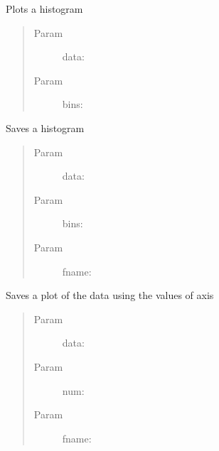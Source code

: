 \documentclass[letterpaper,10pt,english]{sphinxmanual}
\begin{document}

\begin{fulllineitems}
\label{index:SuperHub.Plots.plotHisto}
Plots a histogram
\begin{quote}\begin{description}
\item[{Param }] \leavevmode
data:

\item[{Param }] \leavevmode
bins:

\end{description}\end{quote}

\end{fulllineitems}


\begin{fulllineitems}
\label{index:SuperHub.Plots.saveHisto}
Saves a histogram
\begin{quote}\begin{description}
\item[{Param }] \leavevmode
data:

\item[{Param }] \leavevmode
bins:

\item[{Param }] \leavevmode
fname:

\end{description}\end{quote}

\end{fulllineitems}


\begin{fulllineitems}
\label{index:SuperHub.Plots.savePlot}
Saves a plot of the data using the values of axis
\begin{quote}\begin{description}
\item[{Param }] \leavevmode
data:

\item[{Param }] \leavevmode
num:

\item[{Param }] \leavevmode
fname:

\end{description}\end{quote}

\end{fulllineitems}
\end{document}
